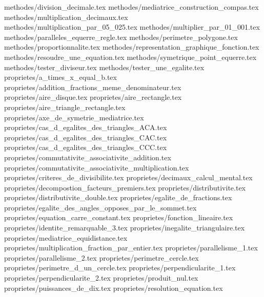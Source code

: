 \catalogues@enonce methodes/division_decimale.tex
\catalogues@enonce methodes/mediatrice_construction_compas.tex
\catalogues@enonce methodes/multiplication_decimaux.tex
\catalogues@enonce methodes/multiplication_par_05_025.tex
\catalogues@enonce methodes/multiplier_par_01_001.tex
\catalogues@enonce methodes/paralleles_equerre_regle.tex
\catalogues@enonce methodes/perimetre_polygone.tex
\catalogues@enonce methodes/proportionnalite.tex
\catalogues@enonce methodes/representation_graphique_fonction.tex
\catalogues@enonce methodes/resoudre_une_equation.tex
\catalogues@enonce methodes/symetrique_point_equerre.tex
\catalogues@enonce methodes/tester_diviseur.tex
\catalogues@enonce methodes/tester_une_egalite.tex
\catalogues@enonce proprietes/a_times_x_equal_b.tex
\catalogues@enonce proprietes/addition_fractions_meme_denominateur.tex
\catalogues@enonce proprietes/aire_disque.tex
\catalogues@enonce proprietes/aire_rectangle.tex
\catalogues@enonce proprietes/aire_triangle_rectangle.tex
\catalogues@enonce proprietes/axe_de_symetrie_mediatrice.tex
\catalogues@enonce proprietes/cas_d_egalites_des_triangles_ACA.tex
\catalogues@enonce proprietes/cas_d_egalites_des_triangles_CAC.tex
\catalogues@enonce proprietes/cas_d_egalites_des_triangles_CCC.tex
\catalogues@enonce proprietes/commutativite_associativite_addition.tex
\catalogues@enonce proprietes/commutativite_associativite_multiplication.tex
\catalogues@enonce proprietes/criteres_de_divisibilite.tex
\catalogues@enonce proprietes/decimaux_calcul_mental.tex
\catalogues@enonce proprietes/decompostion_facteurs_premiers.tex
\catalogues@enonce proprietes/distributivite.tex
\catalogues@enonce proprietes/distributivite_double.tex
\catalogues@enonce proprietes/egalite_de_fractions.tex
\catalogues@enonce proprietes/egalite_des_angles_opposes_par_le_sommet.tex
\catalogues@enonce proprietes/equation_carre_constant.tex
\catalogues@enonce proprietes/fonction_lineaire.tex
\catalogues@enonce proprietes/identite_remarquable_3.tex
\catalogues@enonce proprietes/inegalite_triangulaire.tex
\catalogues@enonce proprietes/mediatrice_equidistance.tex
\catalogues@enonce proprietes/multiplication_fraction_par_entier.tex
\catalogues@enonce proprietes/parallelisme_1.tex
\catalogues@enonce proprietes/parallelisme_2.tex
\catalogues@enonce proprietes/perimetre_cercle.tex
\catalogues@enonce proprietes/perimetre_d_un_cercle.tex
\catalogues@enonce proprietes/perpendicularite_1.tex
\catalogues@enonce proprietes/perpendicularite_2.tex
\catalogues@enonce proprietes/produit_nul.tex
\catalogues@enonce proprietes/puissances_de_dix.tex
\catalogues@enonce proprietes/resolution_equation.tex
